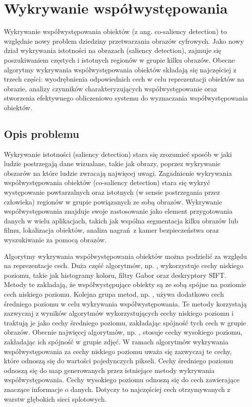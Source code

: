 \documentclass[a4paper,11pt, notitlepage, twosides, openany ]{report}
\begin{document}
	\chapter{Wykrywanie współwystępowania} 

	Wykrywanie współwystępowania obiektów (z ang. co-saliency detection) to względnie nowy problem dziedziny przetwarzania obrazów cyfrowych. Jako nowy dział wykrywania istotności na obrazach (saliency detection), zajmuje się poszukiwaniem częstych i istotnych regionów w grupie kilku obrazów. Obecne algorytmy wykrywania współwystępowania obiektów składają się najczęściej z trzech części: wyodrębnienia odpowiednich cech w celu reprezentacji obiektów na obrazie, analizy czynników  charakteryzujących współwystępowanie oraz stworzenia efektywnego obliczeniowo systemu do wyznaczania współwystępowania obiektów. 

	\section{Opis problemu}
	Wykrywanie istotności (saliency detection) stara się zrozumieć sposób w jaki ludzie postrzegają dane wizualane, takie jak obrazy, poprzez wykrywanie obszarów na które ludzie zwracają najwięcej uwagi. Zagadnienie wykrywania współwystępowania obiektów (co-saliency detection) stara się wykryć występowanie powtarzalnych oraz istotnych (w sensie postrzegania przez człowieka) regionów w grupie powiązanych ze sobą obrazów. Wykrywanie współwystępowania znajduje swoje zastosowanie jako element przygotowania danych w wielu aplikacjach, takich jak wspólna segmentacja kilku obrazów lub filmu, lokalizacja obiektów, analiza nagrań z kamer bezpieczeństwa oraz wyszukiwanie za pomocą obrazów. 

	Algorytmy wykrywania współwystępowania obiektów można podzielić za względu na reprezentacje cech. Duża część algorytmów, np. \cite{ChangLL11}, wykorzystuje cechy niskiego poziomu, takie jak histogramy koloru, filtry Gabor oraz deskryptory SIFT. Metody te zakładają, że współwystępujące obiekty są ze sobą spójne na poziomie cech niskiego poziomu. Kolejna grupa metod, np. \cite{midfeatex}, używa dodatkowo cech średniego poziomu w celu wykrywania współwystępowania. Te metody korzystają zazwyczaj z wyników algorytmów wykorzystujących cechy niskiego poziomu i traktują je jako cechy średniego poziomu, zakładając spójność tych cech w grupie obrazów. Obecnie najwięcej algorytmów, np. \cite{highfeatex}, stosuje cechy wysokiego poziomu, zakładając ich spójność w grupie zdjęć. W ramach algorytmów wykrywania współwystępowania za cechy niskiego poziomu uważa się zazwyczaj te cechy, które odnoszą się do wartości pojedynczych pikseli. Cechy średniego poziomu odnoszą się do map generowanych przez istniejące metody wykrywania współwystępowania. Cechy wysokiego poziomu odnoszą się do cech zawierające znaczące informacje o danych. Dotyczy to najczęściej cech otrzymywanych z warstw głębokich sieci splotowych. 
	
\end{document}
